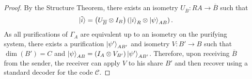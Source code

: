 \documentclass[10pt,a4paper]{amsart}
\begin{document}
\begin{proof}
    By the Structure Theorem, there exists an isometry $U_{\overline{B}}: RA\rightarrow \overline{B}$ such that
    \begin{equation}
        \ket{\tilde{i}}=\left(U_{\overline{B}}\otimes I_B\right)\left(\ket{i}_R \otimes \ket{\psi}_{AB}\right).
    \end{equation}
    As all purifications of $\Gamma_A$ are equivalent up to an isometry on the purifying system, there exists a purification $\ket{\psi'}_{AB'}$ and isometry $V:B'\rightarrow B$ such that $\dim\!\left(B'\right)=C$ and $\ket{\psi}_{AB}=\left(I_A\otimes V_{B'}\right)\ket{\psi'}_{AB'}$.
    Therefore, upon receiving $\overline{B}$ from the sender, the receiver can apply $V$ to his share $B'$ and then recover using a standard decoder for the code $\mathcal{C}$.
\end{proof}
\end{document}
